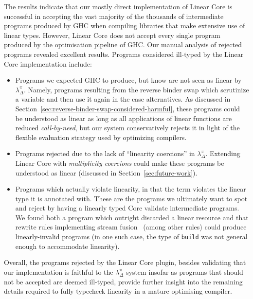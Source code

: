 \documentclass[acmsmall,review,screen]{acmart}
\begin{document}
{\small
  
  }
%
The results indicate that our mostly direct implementation of Linear Core is
successful in accepting the vast majority of the thousands of intermediate
programs produced by GHC when compiling libraries that make extensive use of
linear types.
%
However, Linear Core does not accept every single program produced by the
optimisation pipeline of GHC. Our manual analysis of rejected programs revealed
excellent results. Programs considered ill-typed by the Linear Core
implementation include:
%
\begin{itemize}
    \item Programs we expected GHC to produce, but know are not seen as linear by $\lambda^\pi_\Delta$.
        Namely, programs resulting from the reverse binder swap which
        scrutinize a variable and then use it again in the case alternatives.
        As discussed in Section~\ref{sec:reverse-binder-swap-considered-harmful}, these
        programs could be understood as linear as long as all applications of
        linear functions are reduced \emph{call-by-need}, but our system
        conservatively rejects it in light of the flexible evaluation strategy
        used by optimizing compilers.

    \item Programs rejected due to the lack of ``linearity coercions'' in
        $\lambda^\pi_\Delta$. Extending Linear Core with \emph{multiplicity coercions} 
        could make these programs be understood as linear
        (discussed in Section~\ref{sec:future-work}).

    \item Programs which actually violate linearity, in that the term
        violates the linear type it is annotated with. These are the programs
        we ultimately want to spot and reject by having a linearly typed Core
        validate intermediate programs. We found both a program which outright
        discarded a linear resource and that rewrite rules implementing stream
        fusion~\cite{10.1145/165180.165214,10.1145/1291151.1291199}
        (among other rules) could produce linearly-invalid programs (in one such case,
        the type of \lstinline{build} was not general enough to accommodate linearity).
\end{itemize}
%
Overall, the programs rejected by the Linear Core plugin,
besides validating that our implementation is faithful to the
$\lambda^\pi_\Delta$ system insofar as programs that should not be accepted
are deemed ill-typed, provide further insight into the remaining
details required to fully typecheck linearity in a mature optimising compiler.
\end{document}
